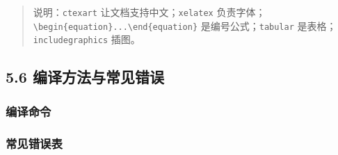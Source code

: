 \begin{Shaded}
\begin{Highlighting}[]
\NormalTok{\{}\NormalTok{\}[h]}
  \NormalTok{[width=0.6}\NormalTok{]\{}\NormalTok{\}}
\NormalTok{\{}\NormalTok{\}}

\NormalTok{\{}\NormalTok{\}}
\end{Highlighting}
\end{Shaded}

\begin{quote}
说明：\texttt{ctexart} 让文档支持中文；\texttt{xelatex}
负责字体；\texttt{\textbackslash{}begin\{equation\}...\textbackslash{}end\{equation\}}
是编号公式；\texttt{tabular} 是表格；\texttt{includegraphics} 插图。
\end{quote}

\subsection{5.6
编译方法与常见错误}\label{ux7f16ux8bd1ux65b9ux6cd5ux4e0eux5e38ux89c1ux9519ux8bef}

\subsubsection{编译命令}\label{ux7f16ux8bd1ux547dux4ee4}

\begin{Shaded}
\begin{Highlighting}[]
\OperatorTok{{-}}       
\end{Highlighting}
\end{Shaded}

\subsubsection{常见错误表}\label{ux5e38ux89c1ux9519ux8befux8868}

